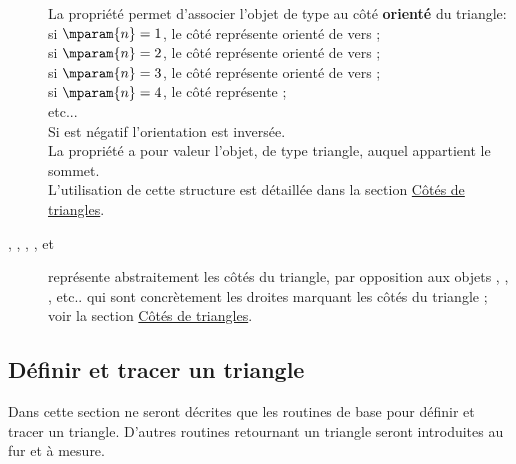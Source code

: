 \documentclass[pdftex]{article}
\begin{document}
\begin{description}
  La propriété  permet d'associer l'objet de type
   au côté \textbf{orienté} du triangle:\\
  si $\mparam{n}=1$, le côté représente  orienté
  de  vers ;\\
  si $\mparam{n}=2$, le côté représente  orienté
  de  vers ;\\
  si $\mparam{n}=3$, le côté représente  orienté
  de  vers ;\\
  si $\mparam{n}=4$, le côté représente ;\\
  etc...\\
  Si  est négatif l'orientation est inversée.\\
  La propriété  a pour valeur \og{}l'objet, de type triangle,
  auquel appartient le sommet\fg{}.\\
  L'utilisation de cette structure est détaillée dans la section
  \href{#subsection.vertex}{Côtés de triangles}.
\item[\param{AB}, \param{BC}, \param{CA}, \param{BA}, \param{AC} et \param{CB}]
  représente abstraitement les côtés du triangle, par opposition aux objets
   , , ,
  etc.. qui sont concrètement les droites marquant les côtés du
  triangle ; voir la section
  \href{#subsection.vertex}{Côtés de triangles}.
\end{description}

\subsection{Définir et tracer un triangle}
Dans cette section ne seront décrites que les routines de base pour
définir et tracer un triangle. D'autres routines retournant un triangle seront
introduites au fur et à mesure.
\end{document}

